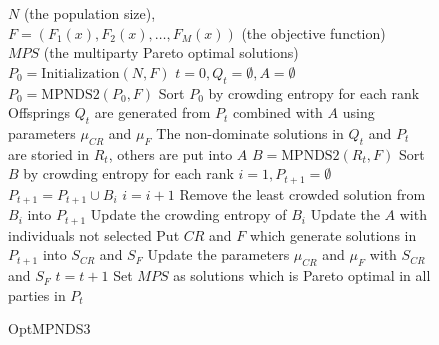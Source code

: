 \documentclass[preprint,12pt]{elsarticle}
\begin{document}
% 
\begin{figure}
	\begin{algorithm}[H]
		\caption{OptMPNDS3}
		\label{alg:OptMPNDS3}
		\begin{algorithmic}[1]
			\REQUIRE $N$ (the population size), \\
			$F=(F_1(x),F_2(x),\dots,F_M(x))$ (the objective function) \\
			\ENSURE $MPS$ (the multiparty Pareto optimal solutions)
			\STATE $P_0 = \text{Initialization}(N, F)$
			\STATE $t = 0,Q_t = \emptyset,A = \emptyset$
			\STATE $P_0 = \text{MPNDS2}(P_0, F)$
			\STATE Sort $P_0$ by crowding entropy for each rank
			 \label{step:OptMPNDS3loop1s}
			\STATE Offsprings $Q_t$ are generated from $P_t$ combined with $A$ using parameters $\mu_{CR}$ and $\mu_{F}$
			\STATE The non-dominate solutions in $Q_t$ and $P_t$ are storied in $R_t$, others are put into $A$
			\STATE $B = \text{MPNDS2}(R_t, F)$
			\STATE Sort $B$ by crowding entropy for each rank
			\STATE $i = 1, P_{t+1} = \emptyset$
			\STATE $P_{t+1} = P_{t+1} \cup B_i$
			\STATE $i = i+1$
			\ENDWHILE
				\STATE Remove the least crowded solution from $B_i$ into $P_{t+1}$
				\STATE Update the crowding entropy of $B_i$
				\ENDWHILE
			\STATE Update the $A$ with individuals not selected
			\STATE Put $CR$ and $F$ which generate solutions in $P_{t+1}$ into $S_{CR}$ and $S_F$
			\STATE Update the parameters $\mu_{CR}$ and $\mu_F$ with $S_{CR}$ and $S_F$
			\STATE $t = t+1$
			\ENDWHILE \label{step:OptMPNDS3loop1e}
			\STATE Set $MPS$ as solutions which is Pareto optimal in all parties in $P_t$
		\end{algorithmic}
	\end{algorithm}
\end{figure}
% 
\end{document}
